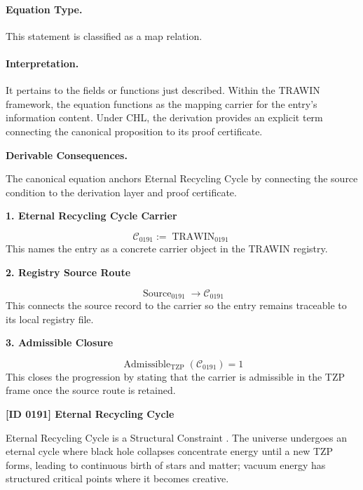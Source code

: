 \paragraph{Equation Type.}
This statement is classified as a map relation.

\paragraph{Interpretation.}
It pertains to the fields or functions just described. Within the TRAWIN framework, the equation functions as the mapping carrier for the entry’s information content. Under CHL, the derivation provides an explicit term connecting the canonical proposition to its proof certificate.

\par\vspace{0.35em}
\noindent\textbf{Derivable Consequences.}\quad
\begingroup
\footnotesize
\raggedright
The canonical equation anchors Eternal Recycling Cycle by connecting the source condition to the derivation layer and proof certificate.
\par\endgroup

\noindent\textbf{1. Eternal Recycling Cycle Carrier}\par
\[
\mathcal{C}_{0191} := \operatorname{TRAWIN}_{0191}
\]
\noindent This names the entry as a concrete carrier object in the TRAWIN registry.\par
\noindent\textbf{2. Registry Source Route}\par
\[
\operatorname{Source}_{0191}\longrightarrow \mathcal{C}_{0191}
\]
\noindent This connects the source record to the carrier so the entry remains traceable to its local registry file.\par
\noindent\textbf{3. Admissible Closure}\par
\[
\operatorname{Admissible}_{\mathrm{TZP}}\!\left(\mathcal{C}_{0191}\right)=1
\]
\noindent This closes the progression by stating that the carrier is admissible in the TZP frame once the source route is retained.\par

\clearpage
\noindent\textbf{[ID 0191] Eternal Recycling Cycle}\par
\vspace{0.35em}
\begingroup\small
{}
Eternal Recycling Cycle is a Structural Constraint  . The universe undergoes an eternal cycle where black hole collapses concentrate energy until a new TZP forms, leading to continuous birth of stars and matter; vacuum energy has structured critical points where it becomes creative.  

